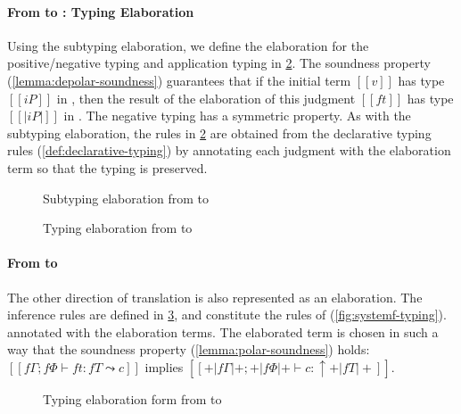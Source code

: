 \documentclass[acmsmall,natbib=false,review,anonymous]{acmart}
\begin{document}
\paragraph{From \fexists to \systemf: Typing Elaboration}
Using the subtyping elaboration, we define the elaboration for the
positive/negative typing and application typing in
\cref{fig:typing-elaboration}.
The soundness property (\cref{lemma:depolar-soundness})
guarantees that if the initial term $[[v]]$ has type $[[iP]]$ in \fexists,
then the result of the elaboration of this judgment $[[ft]]$ has
type $[[|iP|]]$ in \systemf. The negative typing has a symmetric property.
As with the subtyping elaboration, 
the rules in \cref{fig:typing-elaboration} are obtained from 
the \fexists declarative typing rules (\cref{def:declarative-typing})
by annotating each judgment with the elaboration term
so that the typing is preserved.

\begin{figure}[h]
  \ottdefnELLabeled
  \caption{Subtyping elaboration from \fexists to \systemf}
  \label{fig:subt-elaboration}
\end{figure}

\clearpage %
\begin{figure}[t]
  \ottdefnTELNLabeledTwoColumns{}

  \hfill

  \ottdefnTELPAppLabeled{}
  \caption{Typing elaboration from \fexists to \systemf}
  \label{fig:typing-elaboration}
\end{figure}

\paragraph{From \systemf to \fexists}

The other direction of translation is also represented as an elaboration. The
inference rules are defined in \cref{fig:systemf-polarization}, and constitute
the rules of \systemf (\cref{fig:systemf-typing}). annotated with the
elaboration terms. The elaborated term is chosen in such a way that
the soundness property (\cref{lemma:polar-soundness}) holds: 
$[[fΓ ; fΦ ⊢ ft : fT ⤳ c]]$ implies $[[+|fΓ|+ ; +|fΦ|+ ⊢ c : ↑+|fT|+]]$.

\begin{figure}[h]
  \ottdefnELfPolLabeled{}
  \caption{Typing elaboration form from \systemf to \fexists}
  \label{fig:systemf-polarization}
\end{figure}
\end{document}
